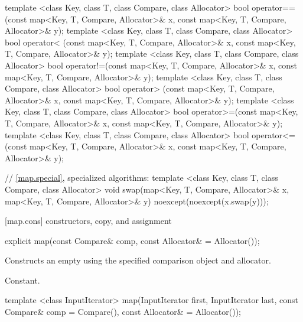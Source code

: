 \begin{codeblock}
{  template <class Key, class T, class Compare, class Allocator>
    bool operator==(const map<Key, T, Compare, Allocator>& x,
                    const map<Key, T, Compare, Allocator>& y);
  template <class Key, class T, class Compare, class Allocator>
    bool operator< (const map<Key, T, Compare, Allocator>& x,
                    const map<Key, T, Compare, Allocator>& y);
  template <class Key, class T, class Compare, class Allocator>
    bool operator!=(const map<Key, T, Compare, Allocator>& x,
                    const map<Key, T, Compare, Allocator>& y);
  template <class Key, class T, class Compare, class Allocator>
    bool operator> (const map<Key, T, Compare, Allocator>& x,
                    const map<Key, T, Compare, Allocator>& y);
  template <class Key, class T, class Compare, class Allocator>
    bool operator>=(const map<Key, T, Compare, Allocator>& x,
                    const map<Key, T, Compare, Allocator>& y);
  template <class Key, class T, class Compare, class Allocator>
    bool operator<=(const map<Key, T, Compare, Allocator>& x,
                    const map<Key, T, Compare, Allocator>& y);

  // \ref{map.special}, specialized algorithms:
  template <class Key, class T, class Compare, class Allocator>
    void swap(map<Key, T, Compare, Allocator>& x,
              map<Key, T, Compare, Allocator>& y)
      noexcept(noexcept(x.swap(y)));
}
\end{codeblock}


[map.cons]{ constructors, copy, and assignment}%
%

%
\begin{itemdecl}
explicit map(const Compare& comp, const Allocator& = Allocator());
\end{itemdecl}

\begin{itemdescr}
\pnum
\effects
Constructs an empty
using the specified comparison object and allocator.

\pnum
\complexity
Constant.
\end{itemdescr}

%
\begin{itemdecl}
template <class InputIterator>
  map(InputIterator first, InputIterator last,
      const Compare& comp = Compare(), const Allocator& = Allocator());
\end{itemdecl}

